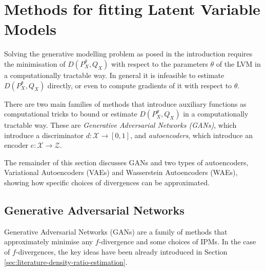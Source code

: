 





\section{Methods for fitting Latent Variable Models}\label{sec:literature-gen-models}

Solving the generative modelling problem as posed in the introduction requires the minimisation of $D(P^\theta_X, Q_X)$ with respect to the parameters $\theta$ of the LVM in a computationally tractable way.
In general it is infeasible to estimate $D(P^\theta_X, Q_X)$ directly, or even to compute gradients of it with respect to $\theta$. 


There are two main families of methods that introduce auxiliary functions as computational tricks to bound or estimate $D(P^\theta_X, Q_X)$ in a computationally tractable way.
These are \emph{Generative Adversarial Networks (GANs)}, which introduce a discriminator $d:\mathcal{X} \to [0,1]$, and \emph{autoencoders}, which introduce an encoder $e:\mathcal{X} \to \mathcal{Z}$.

The remainder of this section discusses GANs and two types of autoencoders, Variational Autoencoders (VAEs) and Wasserstein Autoencoders (WAEs), showing how specific choices of divergences can be approximated.

\subsection{Generative Adversarial Networks}

Generative Adversarial Networks (GANs) are a family of methods that approximately minimise any $f$-divergence and some choices of IPMs. 
In the case of $f$-divergences, the key ideas have been already introduced in Section \ref{sec:literature-density-ratio-estimation}.

